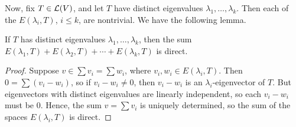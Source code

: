 \documentclass{article}
\begin{document}
Now, fix $T\in\mathcal L(V)$, and let $T$ have distinct eigenvalues $\lambda_1,\ldots, \lambda_k$. Then each of the $E(\lambda_i, T)$, $i\leq k$, are nontrivial. We have the following lemma.
\begin{lemma}
If $T$ has distinct eigenvalues $\lambda_1, \ldots, \lambda_k$, then the sum $E(\lambda_1, T) + E(\lambda_2, T) + \cdots + E(\lambda_k, T)$ is direct.
\end{lemma}
\begin{proof}
Suppose $v\in \sum v_i = \sum w_i$, where $v_i, w_i \in E(\lambda_i, T)$. Then $0 = \sum (v_i - w_i)$, so if $v_i - w_i \neq 0$, then $v_i-w_i$ is an $\lambda_i$-eigenvector of $T$. But eigenvectors with distinct eigenvalues are linearly independent, so each $v_i -w_i$ must be $0$. Hence, the sum $v = \sum v_i$ is uniquely determined, so the sum of the spaces $E(\lambda_i, T)$ is direct.
\end{proof}
\end{document}
